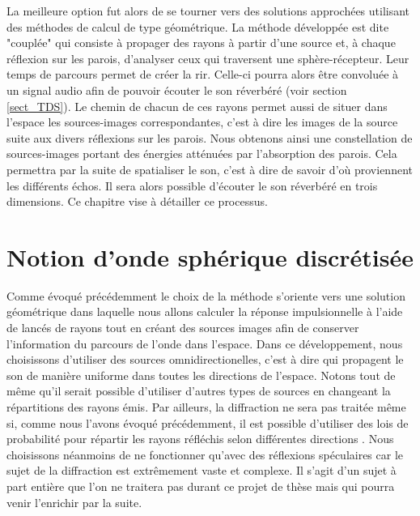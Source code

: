 La meilleure option fut alors de se tourner vers des solutions approchées utilisant des méthodes de calcul de type géométrique. La méthode développée est dite "couplée" qui consiste à propager des rayons à partir d'une source et, à chaque réflexion sur les parois, d'analyser ceux qui traversent une sphère-récepteur. Leur temps de parcours permet de créer la \gls{rir}. Celle-ci pourra alors être convoluée à un signal audio afin de pouvoir écouter le son réverbéré (voir section \ref{sect_TDS}). Le chemin de chacun de ces rayons permet aussi de situer dans l'espace les sources-images correspondantes, c'est à dire les images de la source suite aux divers réflexions sur les parois. Nous obtenons ainsi une constellation de sources-images portant des énergies atténuées par l'absorption des parois. Cela permettra par la suite de spatialiser le son, c'est à dire de savoir d'où proviennent les différents échos. Il sera alors possible d'écouter le son réverbéré en trois dimensions. Ce chapitre vise à détailler ce processus.

\section{Notion d'onde sphérique discrétisée} \label{sect_discretise}

Comme évoqué précédemment le choix de la méthode s'oriente vers une solution géométrique dans laquelle nous allons calculer la réponse impulsionnelle à l'aide de lancés de rayons tout en créant des sources images afin de conserver l'information du parcours de l'onde dans l'espace. Dans ce développement, nous choisissons d'utiliser des sources omnidirectionelles, c'est à dire qui propagent le son de manière uniforme dans toutes les directions de l'espace. Notons tout de même qu'il serait possible d'utiliser d'autres types de sources en changeant la répartitions des rayons émis. Par ailleurs, la diffraction ne sera pas traitée même si, comme nous l'avons évoqué précédemment, il est possible d'utiliser des lois de probabilité pour répartir les rayons réfléchis selon différentes directions \cite[p.187-199]{diffusion}. Nous choisissons néanmoins de ne fonctionner qu'avec des réflexions spéculaires car le sujet de la diffraction est extrêmement vaste et complexe. Il s'agit d'un sujet à part entière que l'on ne traitera pas durant ce projet de thèse mais qui pourra venir l'enrichir par la suite.

